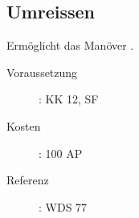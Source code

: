 \subsection{Umreissen}
\label{sf.umreissen}
Ermöglicht das Manöver .
\begin{description}
    \item[Voraussetzung]:
        KK 12, SF 
    \item [Kosten]:
        100 AP
    \item [Referenz]:
        WDS 77
\end{description}
